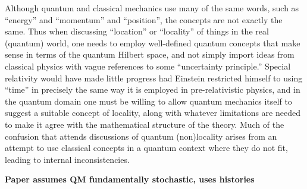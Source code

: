 \documentclass[10pt]{article} %
\def\outl#1{\par{\medskip\noindent\hspace*{.5cm}\bf
      \mathversion{bold}#1\mathversion{normal}\smallskip} }
\def\np{} \def\xa{} \def\xb{} \def\xn{} \def\xp{}
\def\outl#1{} \def\np{} \def\xa{} \def\xb{} \def\xn{} \def\xp{}
\def\outl#1{\par{\medskip\noindent\hspace*{.5cm}\bf
      \mathversion{bold}#1\mathversion{normal}\smallskip} }
\def\np{\newpage }\def\xn{\nopagebreak }\def\xp{\pagebreak }
\begin{document}
Although quantum and classical mechanics use many of the same words, such as
``energy'' and ``momentum'' and ``position'', the concepts are not exactly the
same.  Thus when discussing ``location'' or ``locality'' of things in the real
(quantum) world, one needs to employ well-defined quantum concepts that make
sense in terms of the quantum Hilbert space, and not simply import ideas from
classical physics with vague references to some ``uncertainty principle.''
Special relativity would have made little progress had Einstein restricted
himself to using ``time'' in precisely the same way it is employed in
pre-relativistic physics, and in the quantum domain one must be willing to
allow quantum mechanics itself to suggest a suitable concept of locality,
along with whatever limitations are needed to make it agree with the
mathematical structure of the theory.  Much of the confusion that attends
discussions of quantum (non)locality arises from an attempt to use classical
concepts in a quantum context where they do not fit, leading to internal
inconsistencies.

\xb
\outl{Paper assumes QM fundamentally stochastic, uses histories}
\xa
\end{document}
